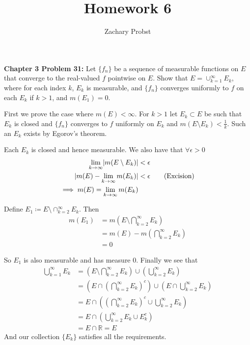 \documentclass[11pt]{article}
\title{Homework 6}
\author{Zachary Probst}
\DeclarePairedDelimiter{\card}{\lvert}{\rvert}
\newcommand{\R}{\mathbb{R}}
\begin{document}
    \maketitle

    \begin{mybox}
        \textbf{Chapter 3 Problem 31:} Let $\{ f_n \}$ be a sequence of measurable functions on $E$ that converge to the real-valued $f$ pointwise on $E$.
        Show that $E = \cup_{k=1}^{\infty} E_k$, where for each index $k$, $E_k$ is measurable, and $\{ f_n \}$ converges uniformly to $f$ on each $E_k$ if $k > 1$, and $m(E_1) = 0$.
    \end{mybox}

    First we prove the case where $m(E) < \infty$.
    For $k > 1$ let $E_k \subset E$  be such that $E_k$ is closed and $\{ f_n \}$ converges to $f$ uniformly on $E_k$ and $m(E \setminus E_k) < \frac{1}{k}$.
    Such an $E_k$ exists by Egorov's theorem.

    Each $E_k$ is closed and hence measurable.
    We also have that $\forall \epsilon > 0$
    \begin{align*}
        \lim_{k \rightarrow \infty} \card{ m(E \setminus E_k) } &< \epsilon \\
        \card{ m(E) - \lim_{k \rightarrow \infty} m(E_k) } &< \epsilon \tag{Excision} \\
        \implies m(E) = \lim_{k \rightarrow \infty} m(E_k)&
    \end{align*}

    Define $E_1 \coloneqq E \setminus \cap_{k=2}^{\infty} E_k$.
    Then
    \begin{align*}
        m(E_1) &= m\left(E \setminus \bigcap_{k=2}^{\infty} E_k\right) \\
        &= m(E) - m \left( \bigcap_{k=2}^{\infty} E_k \right) \tag{Excision} \\
        &= 0
    \end{align*}

    So $E_1$ is also measurable and has measure 0.
    Finally we see that
    \begin{align*}
        \bigcup_{k=1}^{\infty} E_k &= \left( E \setminus \bigcap_{k=2}^{\infty} E_k \right) \cup \left( \bigcup_{k=2}^{\infty} E_k \right) \\
        &= \left( E \cap \left( \bigcap_{k=2}^{\infty} E_k \right)^{c} \right) \cup \left( E \cap  \bigcup_{k=2}^{\infty} E_k \right) \tag{$E_k \subset E$} \\
        &= E \cap \left( \left( \bigcap_{k=2}^{\infty} E_k \right)^{c}  \cup  \bigcup_{k=2}^{\infty} E_k \right)  \\
        &= E \cap \left( \bigcup_{k=2}^{\infty} E_k  \cup E_k ^c \right)  \\
        &= E \cap \R = E
    \end{align*}
    And our collection $\{E_k\}$ satisfies all the requirements.
\end{document}
